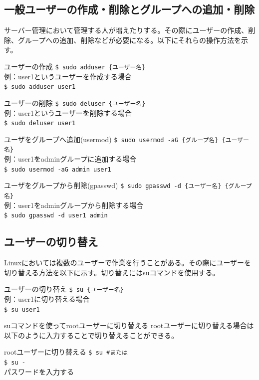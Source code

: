 \documentclass[a4paper, 11pt, dvipdfmx]{jsarticle}
\begin{document}
\subsection{一般ユーザーの作成・削除とグループへの追加・削除}
サーバー管理において管理する人が増えたりする。その際にユーザーの作成、削除、グループへの追加、削除などが必要になる。以下にそれらの操作方法を示す。
\begin{commandbox}{ユーザーの作成}
  \verb|$ sudo adduser {ユーザー名}|\\
  例：user1というユーザーを作成する場合\\
  \verb|$ sudo adduser user1|
\end{commandbox}
\begin{commandbox}{ユーザーの削除}
  \verb|$ sudo deluser {ユーザー名}|\\
  例：user1というユーザーを削除する場合\\
  \verb|$ sudo deluser user1|
\end{commandbox}
\begin{commandbox}{ユーザをグループへ追加(usermod)}
  \verb|$ sudo usermod -aG {グループ名} {ユーザー名}|\\
  例：user1をadminグループに追加する場合\\
  \verb|$ sudo usermod -aG admin user1|
\end{commandbox}
\begin{commandbox}{ユーザをグループから削除(gpasswd)}
  \verb|$ sudo gpasswd -d {ユーザー名} {グループ名}|\\
  例：user1をadminグループから削除する場合\\
  \verb|$ sudo gpasswd -d user1 admin|
\end{commandbox}
\subsection{ユーザーの切り替え}
Linuxにおいては複数のユーザーで作業を行うことがある。その際にユーザーを切り替える方法を以下に示す。切り替えにはsuコマンドを使用する。
\begin{commandbox}{ユーザーの切り替え}
  \verb|$ su {ユーザー名}|\\
  例：user1に切り替える場合\\
  \verb|$ su user1|
\end{commandbox}
\begin{hosokubox}{suコマンドを使ってrootユーザーに切り替える}
  rootユーザーに切り替える場合は以下のように入力することで切り替えることができる。
  \begin{commandbox}{rootユーザーに切り替える}
    \verb|$ su #または|\\
    \verb|$ su -|\\
    パスワードを入力する
  \end{commandbox}
\end{hosokubox}
\end{document}

